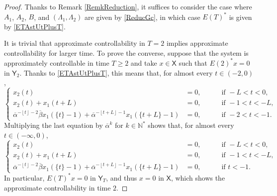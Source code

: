\documentclass[JEP,XML,SOM,Unicode]{cedram}
\theoremstyle{plain}
\theoremstyle{definition}
\newcommand{\floor}[1]{\left\lfloor #1 \right\rfloor}
\begin{document}
\begin{proof}
Thanks to Remark \ref{RemkReduction}, it suffices to consider the case where $A_1$, $A_2$, $B$, and $(\Lambda_1, \Lambda_2)$ are given by \eqref{ReducGc}, in which case $E(T)^\ast$ is given by \eqref{ETAstUtPlusT}.

It is trivial that approximate controllability in $T = 2$ implies approximate controllability for larger time. To prove the converse, suppose that the system is approximately controllable in time $T \geq 2$ and take $x \in \mathsf X$ such that $E(2)^\ast x = 0$ in $\mathsf Y_2$. Thanks to \eqref{ETAstUtPlusT}, this means that, for almost every $t \in (-2, 0)$,
\[
\left\{
\begin{aligned}
x_2(t) & = 0, & \quad & \text{ if } -L < t < 0, \\
x_2(t) + x_1(t + L) & = 0, & & \text{ if } -1 < t < -L, \\
\overline\alpha^{-\floor{t} - 2} \overline\beta x_1(\{t\} - 1) + \overline\alpha^{-\floor{t + L} - 1} x_1(\{t + L\} - 1) & = 0, & & \text{ if } -2 < t < -1.
\end{aligned}
\right.
\]
Multiplying the last equation by $\overline\alpha^k$ for $k \in \mathbb N^\ast$ shows that, for almost every $t \in (-\infty, 0)$,
\[
\left\{
\begin{aligned}
x_2(t) & = 0, & \quad & \text{ if } -L < t < 0, \\
x_2(t) + x_1(t + L) & = 0, & & \text{ if } -1 < t < -L, \\
\overline\alpha^{-\floor{t} - 2} \overline\beta x_1(\{t\} - 1) + \overline\alpha^{-\floor{t + L} - 1} x_1(\{t + L\} - 1) & = 0, & & \text{ if } t < -1.
\end{aligned}
\right.
\]
In particular, $E(T)^\ast x = 0$ in $\mathsf Y_T$, and thus $x = 0$ in $\mathsf X$, which shows the approximate controllability in time $2$.


\end{proof}
\end{document}
